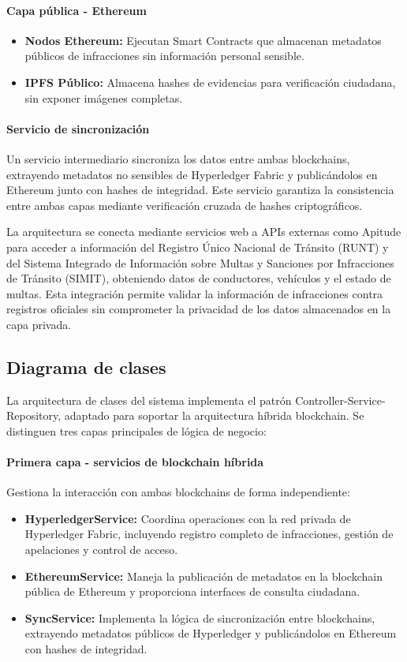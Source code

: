 \paragraph{Capa pública - Ethereum}
\begin{itemize}
    \item \textbf{Nodos Ethereum:} Ejecutan Smart Contracts que almacenan metadatos públicos de infracciones sin información personal sensible.
    \item \textbf{IPFS Público:} Almacena hashes de evidencias para verificación ciudadana, sin exponer imágenes completas.
\end{itemize}

\paragraph{Servicio de sincronización}
Un servicio intermediario sincroniza los datos entre ambas blockchains, extrayendo metadatos no sensibles de Hyperledger Fabric y publicándolos en Ethereum junto con hashes de integridad. Este servicio garantiza la consistencia entre ambas capas mediante verificación cruzada de hashes criptográficos.

La arquitectura se conecta mediante servicios web a APIs externas como Apitude para acceder a información del Registro Único Nacional de Tránsito (RUNT) y del Sistema Integrado de Información sobre Multas y Sanciones por Infracciones de Tránsito (SIMIT), obteniendo datos de conductores, vehículos y el estado de multas. Esta integración permite validar la información de infracciones contra registros oficiales sin comprometer la privacidad de los datos almacenados en la capa privada. 

\subsection{Diagrama de clases}
La arquitectura de clases del sistema implementa el patrón Controller-Service-Repository, adaptado para soportar la arquitectura híbrida blockchain. Se distinguen tres capas principales de lógica de negocio:

\paragraph{Primera capa - servicios de blockchain híbrida}
Gestiona la interacción con ambas blockchains de forma independiente:
\begin{itemize}
    \item \textbf{HyperledgerService:} Coordina operaciones con la red privada de Hyperledger Fabric, incluyendo registro completo de infracciones, gestión de apelaciones y control de acceso.
    \item \textbf{EthereumService:} Maneja la publicación de metadatos en la blockchain pública de Ethereum y proporciona interfaces de consulta ciudadana.
    \item \textbf{SyncService:} Implementa la lógica de sincronización entre blockchains, extrayendo metadatos públicos de Hyperledger y publicándolos en Ethereum con hashes de integridad.
\end{itemize}

